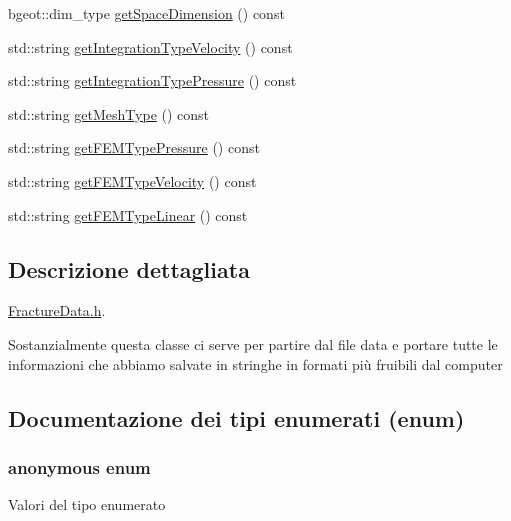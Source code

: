 \begin{DoxyCompactItemize}
\item 
bgeot\-::dim\-\_\-type \hyperlink{classFractureData_a4ead03266295fe14fa3285692f945d89}{get\-Space\-Dimension} () const 
\item 
std\-::string \hyperlink{classFractureData_a8a8a198482de6bf4104746bc1d0510c6}{get\-Integration\-Type\-Velocity} () const 
\item 
std\-::string \hyperlink{classFractureData_a9333d8e89dc92023d97a48c1905ada76}{get\-Integration\-Type\-Pressure} () const 
\item 
std\-::string \hyperlink{classFractureData_aaded6c0452470489beb4ab95b5f4158f}{get\-Mesh\-Type} () const 
\item 
std\-::string \hyperlink{classFractureData_a643b9a8a33405ec7aaa6b5612cb81d57}{get\-F\-E\-M\-Type\-Pressure} () const 
\item 
std\-::string \hyperlink{classFractureData_a7396b67399a1ae8e5550841907c0dcb5}{get\-F\-E\-M\-Type\-Velocity} () const 
\item 
std\-::string \hyperlink{classFractureData_a606c22e054fdb5f8602ce39fa6ae15cc}{get\-F\-E\-M\-Type\-Linear} () const 
\end{DoxyCompactItemize}


\subsection{Descrizione dettagliata}
\hyperlink{FractureData_8h}{Fracture\-Data.\-h}. 

Sostanzialmente questa classe ci serve per partire dal file data e portare tutte le informazioni che abbiamo salvate in stringhe in formati più fruibili dal computer 

\subsection{Documentazione dei tipi enumerati (enum)}
\hypertarget{classFractureData_aaeea1f30482432d159eda9d98beb5e89}{\subsubsection[{anonymous enum}]{\setlength{\rightskip}{0pt plus 5cm}anonymous enum}}\label{classFractureData_aaeea1f30482432d159eda9d98beb5e89}
\begin{Desc}
\item[Valori del tipo enumerato]\par
\begin{description}
\item[{\em 
\hypertarget{classFractureData_aaeea1f30482432d159eda9d98beb5e89a351538e4c78b34b5c0416e21903e1812}{F\-R\-A\-C\-T\-U\-R\-E}\label{classFractureData_aaeea1f30482432d159eda9d98beb5e89a351538e4c78b34b5c0416e21903e1812}
}]\end{description}
\end{Desc}

